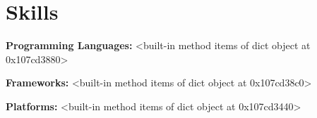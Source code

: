 \section{Skills}

    \begin{onecolentry}
        \textbf{Programming Languages:} <built-in method items of dict object at 0x107cd3880>
    \end{onecolentry}

    \vspace{0.05 cm}

    \begin{onecolentry}
        \textbf{Frameworks:} <built-in method items of dict object at 0x107cd38c0>
    \end{onecolentry}

    \vspace{0.05 cm}

    \begin{onecolentry}
        \textbf{Platforms:} <built-in method items of dict object at 0x107cd3440>
    \end{onecolentry}

    \vspace{0.05 cm}

